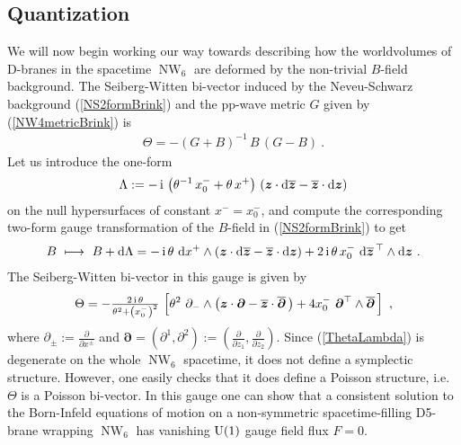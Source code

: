 \documentclass[11pt,a4paper]{article}
\DeclareMathOperator{\NW}{NW}
\newcommand{\mbf}[1]{{\boldsymbol {#1} }}
\def\ii{{\,{\rm i}\,}}
\def\dd{{\rm d}}
\def\mz{{\mbf z}}
\def\mdell{{\mbf\partial}}
\newcommand{\beq}{\begin{eqnarray}}
\newcommand{\eeq}{\end{eqnarray}}
\begin{document}
\subsection{Quantization\label{NWQuant}}

We will now begin working our way towards describing how
the worldvolumes of D-branes in the spacetime $\NW_6$ are
deformed by the non-trivial $B$-field background. The Seiberg-Witten
bi-vector induced by the Neveu-Schwarz background (\ref{NS2formBrink})
and the pp-wave metric $G$ given by (\ref{NW4metricBrink}) is
\beq
\Theta=-(G+B)^{-1}\,B\,(G-B) \ .
\label{SWTheta}\eeq
Let us introduce the one-form
\beq
\Lambda:=-\ii\left(\theta^{-1}\,x_0^-+\theta\,x^+\right)\,\left(
\mz\cdot\dd\overline{\mz}-\overline{\mz}\cdot\dd\mz
\right)
\label{Lambdadef}\eeq
on the null hypersurfaces of constant $x^-=x_0^-$, and compute the
corresponding two-form gauge transformation of the $B$-field in
(\ref{NS2formBrink}) to get
\beq
B~\longmapsto~B+\dd\Lambda=-\ii\theta~\dd x^+\wedge\left(
\mz\cdot\dd\overline{\mz}-\overline{\mz}\cdot\dd\mz
\right)+2\ii\theta\,x_0^-~\dd\overline{\mz}{}^{\,\top}
\wedge\dd\mz \ .
\label{B6gaugeequiv}\eeq
The Seiberg-Witten bi-vector in this gauge is given by
\beq
\Theta=-\mbox{$\frac{2\ii\theta}{\theta^2+\left(x_0^-\right)^2}$}\,
\left[\theta^2~\partial_-\wedge\left(\mz\cdot\mdell-
\overline{\mz}\cdot\overline{\mdell}\,\right)+4x_0^-~
\mdell^\top\wedge\overline{\mdell}\,\right] \ ,
\label{ThetaLambda}\eeq
where $\partial_\pm:=\frac\partial{\partial x^\pm}$ and
$\mdell=(\partial^1,\partial^2):=(\frac\partial{\partial
  z_1},\frac\partial{\partial z_2})$. Since (\ref{ThetaLambda}) is
degenerate on the whole $\NW_6$ spacetime, it does not define a
symplectic structure. However, one easily checks that it does define a
Poisson structure, i.e. $\Theta$ is a Poisson bi-vector. In this gauge
one can show that a consistent solution to the Born-Infeld equations
of motion on a non-symmetric spacetime-filling D5-brane wrapping
$\NW_6$ has vanishing ${\rm U}(1)$ gauge field flux $F=0$.
\end{document}
